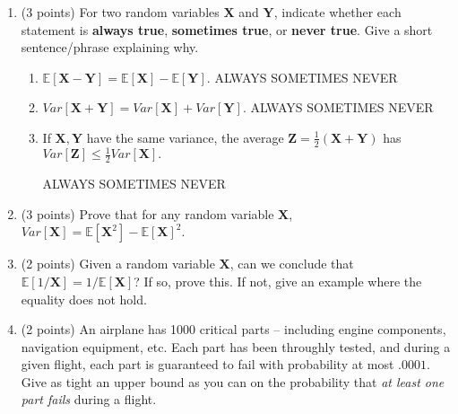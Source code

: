 \documentclass[11pt]{article}
\newcommand{\bv}[1]{\mathbf{#1}}
\newcommand{\E}{\mathbb{E}}
\begin{document}
\begin{enumerate}
\item (3 points) For two random variables $\bv X$ and $\bv{Y}$, indicate whether each statement is \textbf{always true}, \textbf{sometimes true}, or \textbf{never true}. Give a short sentence/phrase explaining why.
\begin{enumerate}
\item $\E[\bv{X} - \bv{Y} ] = \E[\bv{X}] - \E[\bv{Y}] $. \hspace{1em}ALWAYS\hspace{1em} SOMETIMES\hspace{1em} NEVER
\vspace{7em}
\item $Var[\bv{X} + \bv{Y} ] = Var[\bv{X}] + Var[\bv{Y}] $. \hspace{1em}ALWAYS\hspace{1em} SOMETIMES\hspace{1em} NEVER
\vspace{7em}
\item If $\bv{X}, \bv{Y}$ have the same variance, the average $\bv{Z} = \frac{1}{2} \left ( \bv{X} + \bv{Y} \right )$ has $Var[\bv{Z}] \le \frac{1}{2} Var[\bv{X}].$ 

\smallskip \hspace{.75em}ALWAYS\hspace{.75em} SOMETIMES\hspace{.75em} NEVER
\vspace{7em}
\end{enumerate}
\clearpage
\item (3 points) Prove that for any random variable $\bv X$, $Var[\bv X] = \E[\bv X^2] - \E[\bv X]^2$.
\vspace{16em}
\item (2 points) Given a random variable $\bv X$, can we conclude that $\E[1/\bv X] = 1/\E[\bv X]$? If so, prove this. If not, give an example where  the equality  does not hold.
\vspace{16em}
\item (2 points) An airplane has 1000 critical parts -- including engine components, navigation equipment, etc. Each part has been throughly tested, and during a given flight, each part is guaranteed to fail with probability at most $.0001$. Give as tight an upper bound as you can on the probability  that \emph{at least one part fails} during a flight. %
\vspace{16em}
\end{enumerate}
\end{document}
